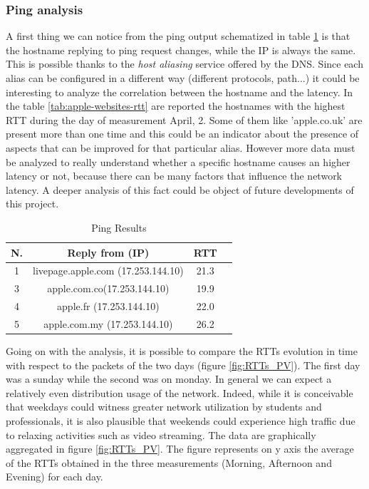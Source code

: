 \documentclass[a4paper,10pt]{article}
\begin{document}
        \newpage
\begin{multicols}{2}
        

\subsubsection*{Ping analysis}
A first thing we can notice from the ping output schematized in table \ref{tab:ping-results} is that the hostname replying to ping request changes, 
while the IP is always the same. This is possible thanks to the \textit{host aliasing} service offered by the DNS. 
Since each alias can be configured in a different way (different protocols, path...) it could be interesting to analyze the correlation between the hostname and the latency. 
In the table \ref{tab:apple-websites-rtt} are reported the hostnames with the highest RTT during the day of measurement April, 2. 
Some of them like 'apple.co.uk' are present more than one time and this could be an indicator about the presence of aspects that can be improved 
for that particular alias. However more data must be analyzed to really understand whether a specific hostname causes an higher latency or not, because
there can be many factors that influence the network latency.
A deeper analysis of this fact could be object of future developments of this project.

        \begin{table}[H]
                \centering
                \caption{\small Ping Results}
                \vspace{0.3cm}
                \begin{tabular}{|c|c|c|c|}
                \hline
                \textbf{N.} & \textbf{Reply from (IP)} & \textbf{RTT} \\ \hline
                1 & livepage.apple.com (17.253.144.10) & 21.3\\ \hline
                3 & apple.com.co(17.253.144.10) & 19.9\\ \hline
                4 & apple.fr (17.253.144.10) & 22.0\\ \hline
                5 & apple.com.my (17.253.144.10) & 26.2\\ \hline
                \end{tabular}
                \label{tab:ping-results}
        \end{table}


     
\noindent
Going on with the analysis, it is possible to compare the RTTs evolution in time with respect to the packets of the two days (figure \ref{fig:RTTs_PV}). 
The first day was a sunday while the second was on monday. 
In general we can expect a relatively even distribution usage of the network. Indeed, while it is conceivable that weekdays could witness greater network utilization by students and professionals, 
it is also plausible that weekends could experience high traffic due to relaxing activities such as video streaming.
The data are graphically aggregated in figure \ref{fig:RTTs_PV}. The figure represents on y axis the average of the RTTs obtained in the three
measurements (Morning, Afternoon and Evening) for each day.

\end{multicols}
\end{document}
